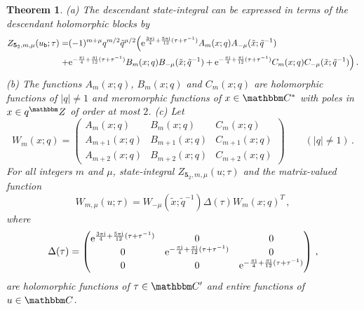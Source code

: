 \documentclass[12pt,reqno]{amsart}
\newtheorem{theorem}{Theorem}
\theoremstyle{definition}
\def\BZ{\mathbbm Z}
\def\BC{\mathbbm C}
\def\tq{\tilde{q}}
\def\tx{\tilde{x}}
\def\ri{\mathrm{i}}
\def\tx{\tilde{x}}
\def\re{{\rm e}}
\def\ri{{\rm i}}
\def\ub{u_{\mathsf{b}}}
\def\md{\mathbf}
\newcommand{\knot}[1]{\md{#1}}
\newcommand{\nn}{\nonumber \\}
\begin{document}
\begin{theorem}
  \label{thm.52a}
  \rm{(a)} The descendant state-integral can be expressed in terms of
  the descendant holomorphic blocks by
  \begin{align}
    Z_{\knot{5}_2,m,\mu}(\ub;\tau) 
    =
    &(-1)^{m+\mu}
      q^{m/2}\tq^{\mu/2}\Big(
      \re^{\frac{3\pi\ri}{4}+\frac{5\pi\ri}{12}(\tau+\tau^{-1})}
      A_m(x;q) A_{-\mu}(\tx;\tq^{-1}) \nn + 
    &\re^{-\frac{\pi\ri}{4}+\frac{\pi\ri}{12}(\tau+\tau^{-1})}
      B_{m}(x;q) B_{-\mu}(\tx;\tq^{-1})
      + \re^{-\frac{\pi\ri}{4}+\frac{\pi\ri}{12}(\tau+\tau^{-1})}
      C_{m}(x;q) C_{-\mu}(\tx;\tq^{-1})\Big)\,.
    \label{52x-desc-fac}
  \end{align}
  \rm{(b)} The functions $A_m(x;q)$, $B_m(x;q)$ and $C_m(x;q)$ are
  holomorphic functions of $|q| \neq 1$ and meromorphic functions of
  $x \in \BC^*$ with poles in $x \in q^\BZ$ of order at most $2$.
  \newline
  \rm{(c)} Let 
  \begin{equation}
    W_m(x;q) = \begin{pmatrix}
      A_{m}(x;q) & B_{m}(x;q) & C_{m}(x;q) \\
      A_{m+1}(x;q) & B_{m+1}(x;q) & C_{m+1}(x;q) \\
      A_{m+2}(x;q) & B_{m+2}(x;q) & C_{m+2}(x;q) 
    \end{pmatrix} \qquad (|q| \neq 1) \,.
    \label{eq:Wm52}
  \end{equation}
  For all integers $m$ and $\mu$, state-integral $Z_{\knot{5}_2,m,\mu}(u;\tau)$
  and the matrix-valued function
  \begin{equation}
    W_{m,\mu}(u;\tau) = W_{-\mu}(\tx;\tq^{-1}) \Delta(\tau) 
    W_m(x;q)^T \,,
    \label{W52x-desc}
  \end{equation}
  where 
  \begin{equation}
    \label{D52}
    \Delta(\tau) = \begin{pmatrix}
      \re^{\frac{3\pi\ri}{4}+\frac{5\pi\ri}{12}(\tau+\tau^{-1})}&0&0\\
      0&\re^{-\frac{\pi\ri}{4}+\frac{\pi\ri}{12}(\tau+\tau^{-1})}&0\\
      0&0&\re^{-\frac{\pi\ri}{4}+\frac{\pi\ri}{12}(\tau+\tau^{-1})}\\
    \end{pmatrix} \,,
  \end{equation}
  are holomorphic functions of $\tau \in \BC'$ and entire
  functions of $u \in \BC$.
\end{theorem}
\end{document}
